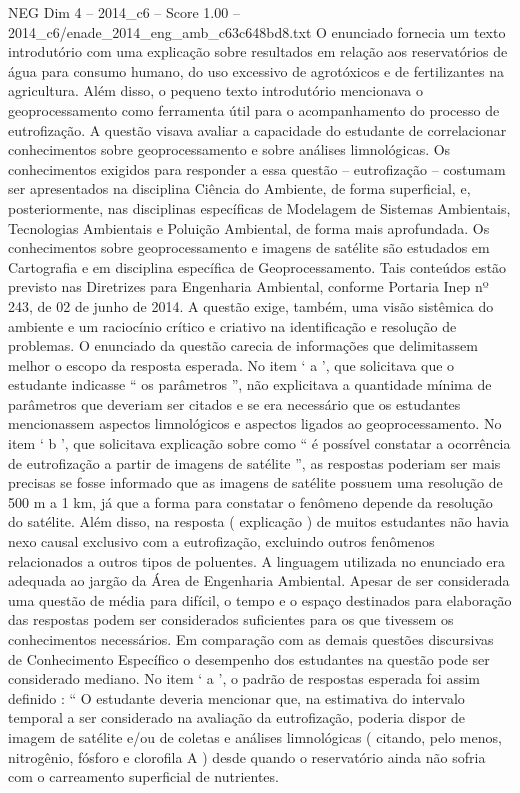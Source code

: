 \begin{textsample}{NEG Dim 4 – 2014\_c6 – Score 1.00 – 2014\_c6/enade\_2014\_eng\_amb\_c63c648bd8.txt}
O enunciado fornecia um texto introdutório com uma explicação sobre resultados em relação aos reservatórios de água para consumo humano, do uso excessivo de agrotóxicos e de fertilizantes na agricultura.
Além disso, o pequeno texto introdutório mencionava o geoprocessamento como ferramenta útil para o acompanhamento do processo de eutrofização.
A questão visava avaliar a capacidade do estudante de correlacionar conhecimentos sobre geoprocessamento e sobre análises limnológicas.
Os conhecimentos exigidos para responder a essa questão – eutrofização – costumam ser apresentados na disciplina Ciência do Ambiente, de forma superficial, e, posteriormente, nas disciplinas específicas de Modelagem de Sistemas Ambientais, Tecnologias Ambientais e Poluição Ambiental, de forma mais aprofundada.
Os conhecimentos sobre geoprocessamento e imagens de satélite são estudados em Cartografia e em disciplina específica de Geoprocessamento.
Tais conteúdos estão previsto nas Diretrizes para Engenharia Ambiental, conforme Portaria Inep nº 243, de 02 de junho de 2014.
A questão exige, também, uma visão sistêmica do ambiente e um raciocínio crítico e criativo na identificação e resolução de problemas.
O enunciado da questão carecia de informações que delimitassem melhor o escopo da resposta esperada.
No item ‘ a ’, que solicitava que o estudante indicasse “ os parâmetros ”, não explicitava a quantidade mínima de parâmetros que deveriam ser citados e se era necessário que os estudantes mencionassem aspectos limnológicos e aspectos ligados ao geoprocessamento.
No item ‘ b ’, que solicitava explicação sobre como “ é possível constatar a ocorrência de eutrofização a partir de imagens de satélite ”, as respostas poderiam ser mais precisas se fosse informado que as imagens de satélite possuem uma resolução de 500 m a 1 km, já que a forma para constatar o fenômeno depende da resolução do satélite.
Além disso, na resposta ( explicação ) de muitos estudantes não havia nexo causal exclusivo com a eutrofização, excluindo outros fenômenos relacionados a outros tipos de poluentes.
A linguagem utilizada no enunciado era adequada ao jargão da Área de Engenharia Ambiental.
Apesar de ser considerada uma questão de média para difícil, o tempo e o espaço destinados para elaboração das respostas podem ser considerados suficientes para os que tivessem os conhecimentos necessários.
Em comparação com as demais questões discursivas de Conhecimento Específico o desempenho dos estudantes na questão pode ser considerado mediano.
No item ‘ a ’, o padrão de respostas esperada foi assim definido : “ O estudante deveria mencionar que, na estimativa do intervalo temporal a ser considerado na avaliação da eutrofização, poderia dispor de imagem de satélite e/ou de coletas e análises limnológicas ( citando, pelo menos, nitrogênio, fósforo e clorofila A ) desde quando o reservatório ainda não sofria com o carreamento superficial de nutrientes.

\end{textsample}
